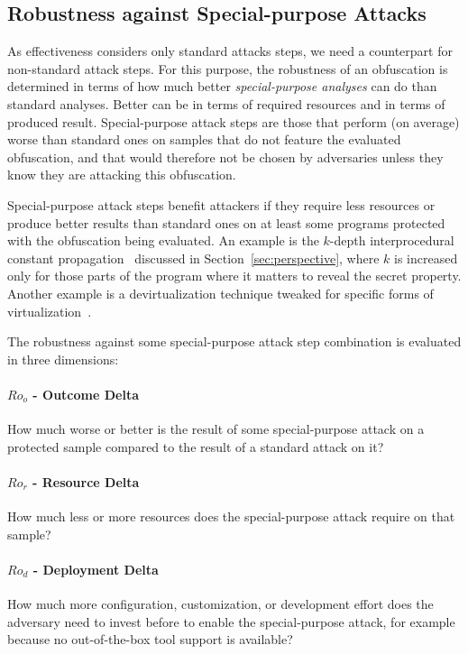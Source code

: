 \subsection{Robustness against Special-purpose Attacks}
As effectiveness considers only standard attacks steps, we need a counterpart for non-standard attack steps. For this purpose, the robustness of an obfuscation is determined in terms of how much better \emph{special-purpose analyses} can do than standard analyses. Better can be in terms of required resources and in terms of produced result. Special-purpose attack steps are those that perform (on average) worse than standard ones on samples that do not feature the evaluated obfuscation, and that would therefore not be chosen by adversaries unless they know they are attacking this obfuscation. 

Special-purpose attack steps benefit attackers if they require less resources or produce better results than standard ones on at least some programs protected with the obfuscation being evaluated. An example is the $k$-depth interprocedural constant propagation~\cite{interp_cp} discussed in Section~\ref{sec:perspective}, where $k$ is increased only for those parts of the program where it matters to reveal the secret property. Another example is a devirtualization technique tweaked for specific forms of virtualization~\cite{deobf_virtualization,kinder}.

The robustness against some special-purpose attack step combination is evaluated in three dimensions:

\paragraph{$Ro_o$ - Outcome Delta} How much worse or better is the result of some special-purpose attack on a protected sample compared to the result of a standard attack on it?

\paragraph{$Ro_r$ - Resource Delta} How much less or more resources does the special-purpose attack require on that sample?

\paragraph{$Ro_d$ - Deployment Delta} How much more configuration, customization, or development effort does the adversary need to invest before to enable the special-purpose attack, for example because no out-of-the-box tool support is available?

